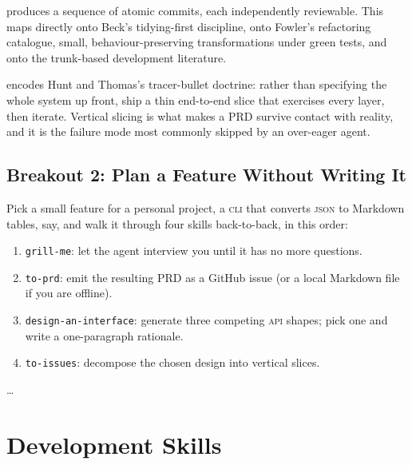 \documentclass{../sharedAssets/tufte}
\begin{document}
 produces a sequence of atomic
commits, each independently reviewable. This maps directly onto Beck's
tidying-first discipline, onto Fowler's refactoring catalogue, small,
behaviour-preserving transformations under green
tests\cite{fowler2018refactoring}, and onto the trunk-based development
literature.

 encodes Hunt and Thomas's
tracer-bullet doctrine\cite{hunt1999pragmatic}: rather than
specifying the whole system up front, ship a thin end-to-end slice that
exercises every layer, then iterate. Vertical slicing is what makes a
PRD survive contact with reality, and it is the failure mode most
commonly skipped by an over-eager agent.

\section{Breakout 2: Plan a Feature Without Writing It}
\label{sec:breakout-2}

 Pick a small feature for a personal project, a
\textsc{cli} that converts \textsc{json} to Markdown tables, say, and
walk it through four skills back-to-back, in this order:

\begin{enumerate}
  \item \texttt{grill-me}: let the agent interview you until it has no
        more questions.
  \item \texttt{to-prd}: emit the resulting PRD as a GitHub issue
        (or a local Markdown file if you are offline).
  \item \texttt{design-an-interface}: generate three competing
        \textsc{api} shapes; pick one and write a one-paragraph
        rationale.
  \item \texttt{to-issues}: decompose the chosen design into
        vertical slices.
\end{enumerate}


\vspace{1em}
\dots

\chapter{Development Skills}
\label{ch:development}
\end{document}
